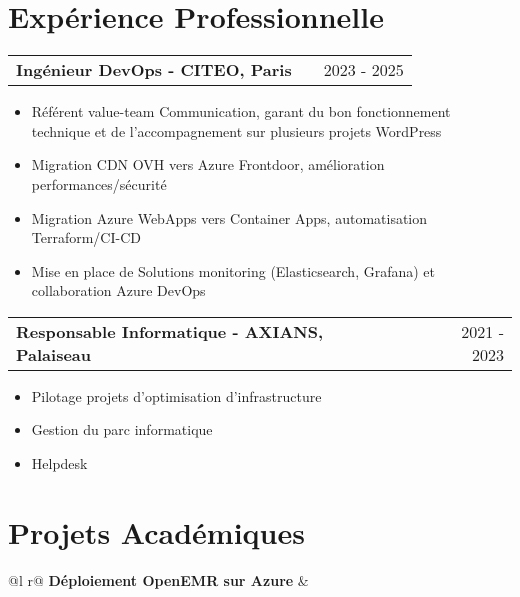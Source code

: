 \documentclass[a4paper,11pt]{article}
\makeatletter
\newenvironment{joblong}[2]
    {
    \begin{tabularx}{\linewidth}{@{}l X r@{}}
    \textbf{#1} & \hfill &  #2 \\[2pt]
    \end{tabularx}
    \begin{minipage}[t]{\linewidth}
    \begin{itemize}[nosep,after=\strut, leftmargin=1em, itemsep=1pt,label=--]
    }
    {
    \end{itemize}
    \end{minipage}    
    }
\makeatother
\begin{document}
\vspace{6pt}


\section{Expérience Professionnelle}

\begin{joblong}{Ingénieur DevOps - CITEO, Paris}{2023 - 2025}
\item Référent value-team Communication,  garant du bon fonctionnement technique et de l’accompagnement sur plusieurs projets WordPress
\item Migration CDN OVH vers Azure Frontdoor, amélioration performances/sécurité
\item Migration Azure WebApps vers Container Apps, automatisation Terraform/CI-CD
\item Mise en place de Solutions monitoring (Elasticsearch, Grafana) et collaboration Azure DevOps
\end{joblong}

\vspace{3pt}

\begin{joblong}{Responsable Informatique - AXIANS, Palaiseau}{2021 - 2023}
\item Pilotage projets d'optimisation d'infrastructure
\item Gestion du parc informatique
\item Helpdesk
\end{joblong}

\vspace{6pt}

  
\section{Projets Académiques}

\begin{tabularx}{\linewidth}{ @{}l r@{} }
\textbf{Déploiement OpenEMR sur Azure} & \hfill \\[1pt]
 \\
\end{tabularx}
\end{document}
